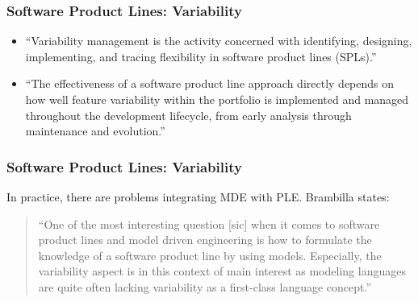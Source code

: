 \documentclass{beamer}
\begin{document}
\begin{frame}
\frametitle{Software Product Lines: Variability}

\begin{itemize}

\item ``Variability management is the activity concerned with
  identifying, designing, implementing, and tracing flexibility in
  software product lines (SPLs).''\cite{voelter2007handling}

\pause

\item ``The effectiveness of a software product line approach directly
  depends on how well feature variability within the portfolio is
  implemented and managed throughout the development lifecycle, from
  early analysis through maintenance and evolution.''
  \cite{groher2007expressing}

\end{itemize}

\end{frame}

\begin{frame}
\frametitle{Software Product Lines: Variability}

In practice, there are problems integrating \ac{MDE} with
\ac{PLE}. Brambilla states\cite{brambilla2012model}:

\begin{quote}
``One of the most interesting question [sic] when it comes to software
product lines and model driven engineering is how to formulate the
knowledge of a software product line by using models. Especially, the
variability aspect is in this context of main interest as modeling
languages are quite often lacking variability as a first-class
language concept.''
\end{quote}

\end{frame}
\end{document}
